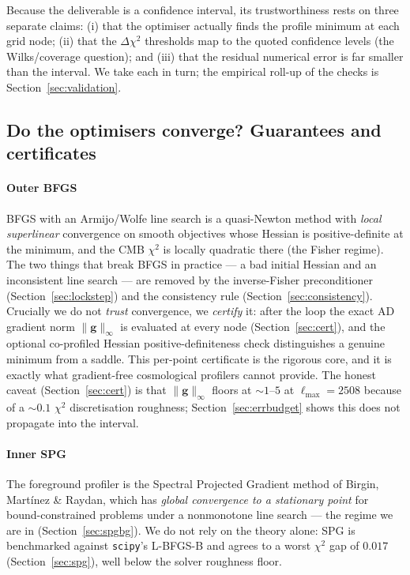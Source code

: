 \documentclass[11pt]{article}
\newcommand{\code}[1]{\texttt{\small #1}}
\newcommand{\chisq}{\chi^2}
\newcommand{\ginf}{\lVert \bm{g}\rVert_\infty}
\newcommand{\Lmax}{\ell_{\max}}
\begin{document}
Because the deliverable is a confidence interval, its trustworthiness rests
on three separate claims: (i) that the optimiser actually finds the profile
minimum at each grid node; (ii) that the $\Delta\chisq$ thresholds map to
the quoted confidence levels (the Wilks/coverage question); and (iii) that
the residual numerical error is far smaller than the interval. We take each
in turn; the empirical roll-up of the checks is Section~\ref{sec:validation}.

\subsection{Do the optimisers converge? Guarantees and certificates}
\label{sec:converge}

\paragraph{Outer BFGS}
BFGS with an Armijo/Wolfe line search is a quasi-Newton method with
\emph{local superlinear} convergence on smooth objectives whose Hessian is
positive-definite at the minimum, and the CMB $\chisq$ is locally quadratic
there (the Fisher regime). The two things that break BFGS in practice ---
a bad initial Hessian and an inconsistent line search --- are removed by
the inverse-Fisher preconditioner (Section~\ref{sec:lockstep}) and the
consistency rule (Section~\ref{sec:consistency}). Crucially we do not
\emph{trust} convergence, we \emph{certify} it: after the loop the exact
AD gradient norm $\ginf$ is evaluated at every node
(Section~\ref{sec:cert}), and the optional co-profiled Hessian
positive-definiteness check distinguishes a genuine minimum from a saddle.
This per-point certificate is the rigorous core, and it is exactly what
gradient-free cosmological profilers cannot provide. The honest caveat
(Section~\ref{sec:cert}) is that $\ginf$ floors at $\sim1$--$5$ at
$\Lmax=2508$ because of a $\sim0.1$ $\chisq$ discretisation roughness;
Section~\ref{sec:errbudget} shows this does not propagate into the interval.

\paragraph{Inner SPG}
The foreground profiler is the Spectral Projected Gradient method of
Birgin, Mart\'inez \& Raydan, which has \emph{global convergence to a
stationary point} for bound-constrained problems under a nonmonotone line
search --- the regime we are in (Section~\ref{sec:spgbg}). We do not rely
on the theory alone: SPG is benchmarked against \code{scipy}'s L-BFGS-B and
agrees to a worst $\chisq$ gap of $0.017$ (Section~\ref{sec:spg}), well
below the solver roughness floor.
\end{document}

